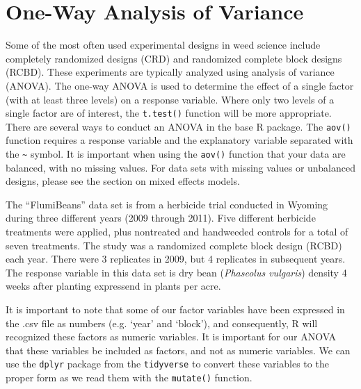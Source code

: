 \documentclass[letterpaper,]{book}
\newenvironment{Shaded}{\begin{snugshade}}{\end{snugshade}}
\newcommand{\CommentTok}[1]{\textcolor[rgb]{0.56,0.35,0.01}{\textit{#1}}}
\newcommand{\DataTypeTok}[1]{\textcolor[rgb]{0.13,0.29,0.53}{#1}}
\newcommand{\FloatTok}[1]{\textcolor[rgb]{0.00,0.00,0.81}{#1}}
\newcommand{\KeywordTok}[1]{\textcolor[rgb]{0.13,0.29,0.53}{\textbf{#1}}}
\newcommand{\NormalTok}[1]{#1}
\newcommand{\OperatorTok}[1]{\textcolor[rgb]{0.81,0.36,0.00}{\textbf{#1}}}
\newcommand{\StringTok}[1]{\textcolor[rgb]{0.31,0.60,0.02}{#1}}
\begin{document}
\hypertarget{one-way-analysis-of-variance}{%
\section{One-Way Analysis of Variance}\label{one-way-analysis-of-variance}}

Some of the most often used experimental designs in weed science include completely randomized designs (CRD) and randomized complete block designs (RCBD). These experiments are typically analyzed using analysis of variance (ANOVA). The one-way ANOVA is used to determine the effect of a single factor (with at least three levels) on a response variable. Where only two levels of a single factor are of interest, the \texttt{t.test()} function will be more appropriate. There are several ways to conduct an ANOVA in the base R package. The \texttt{aov()} function requires a response variable and the explanatory variable separated with the \texttt{\textasciitilde{}} symbol. It is important when using the \texttt{aov()} function that your data are balanced, with no missing values. For data sets with missing values or unbalanced designs, please see the section on mixed effects models.

The ``FlumiBeans'' data set is from a herbicide trial conducted in Wyoming during three different years (2009 through 2011). Five different herbicide treatments were applied, plus nontreated and handweeded controls for a total of seven treatments. The study was a randomized complete block design (RCBD) each year. There were 3 replicates in 2009, but 4 replicates in subsequent years. The response variable in this data set is dry bean (\emph{Phaseolus vulgaris}) density 4 weeks after planting expressend in plants per acre.

It is important to note that some of our factor variables have been expressed in the .csv file as numbers (e.g. `year' and `block'), and consequently, R will recognized these factors as numeric variables. It is important for our ANOVA that these variables be included as factors, and not as numeric variables. We can use the \texttt{dplyr} package from the \texttt{tidyverse} to convert these variables to the proper form as we read them with the \texttt{mutate()} function.

\begin{Shaded}
\end{Shaded}
\end{document}
